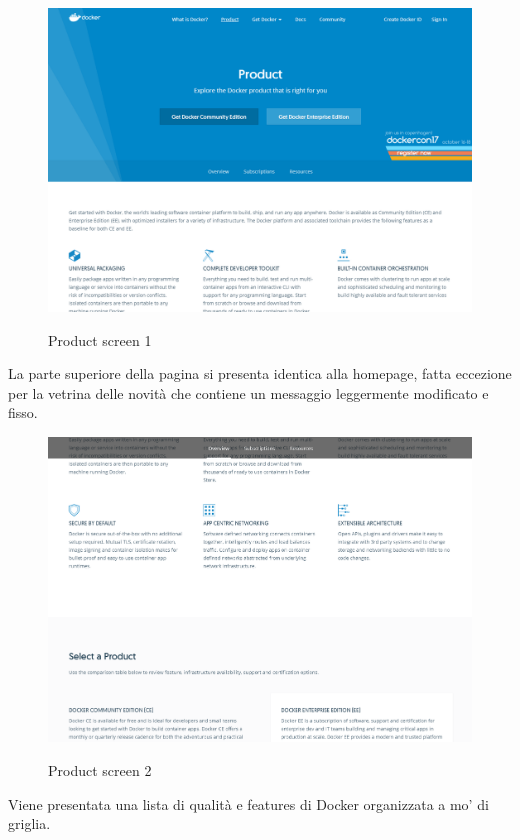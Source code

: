 \documentclass[a4paper]{article}
\begin{document}
\begin{figure}[H]
	\centering
	\includegraphics[width=\linewidth]{images/product1.png}
    \label{fig:product1}
    \caption{Product screen 1}
\end{figure}

\noindent La parte superiore della pagina si presenta identica alla homepage, fatta eccezione per la vetrina delle novità che contiene un messaggio leggermente modificato e fisso.

\begin{figure}[H]
	\centering
	\includegraphics[width=\linewidth]{images/product2.png}
    \label{fig:product2}
    \caption{Product screen 2}
\end{figure}

\noindent Viene presentata una lista di qualità e features di Docker organizzata a mo' di griglia.
\end{document}
